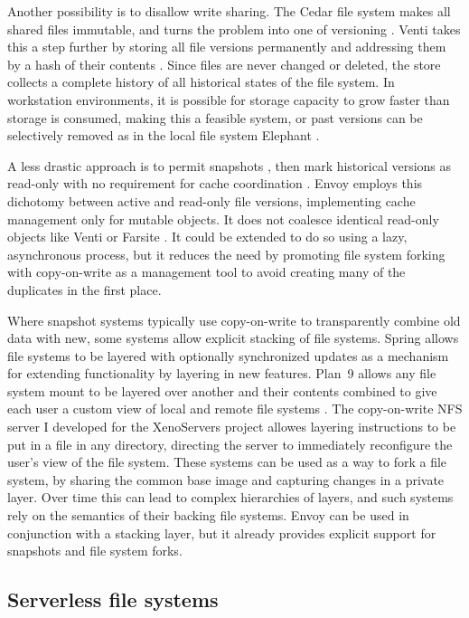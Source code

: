 Another possibility is to disallow write sharing. The Cedar file system \cite{schroeder} makes all shared files immutable, and turns the problem into one of versioning \cite{gifford}. Venti takes this a step further by storing all file versions permanently and addressing them by a hash of their contents \cite{quinlan}. Since files are never changed or deleted, the store collects a complete history of all historical states of the file system. In workstation environments, it is possible for storage capacity to grow faster than storage is consumed, making this a feasible system, or past versions can be selectively removed as in the local file system Elephant \cite{santry}.

A less drastic approach is to permit snapshots \cite{hitz}, then mark historical versions as read-only with no requirement for cache coordination \cite{warfield}. Envoy employs this dichotomy between active and read-only file versions, implementing cache management only for mutable objects. It does not coalesce identical read-only objects like Venti or Farsite \cite{douceur02}. It could be extended to do so using a lazy, asynchronous process, but it reduces the need by promoting file system forking with copy-on-write as a management tool to avoid creating many of the duplicates in the first place.

Where snapshot systems typically use copy-on-write to transparently combine old data with new, some systems allow explicit stacking of file systems. Spring \cite{khalidi} allows file systems to be layered with optionally synchronized updates as a mechanism for extending functionality by layering in new features. Plan~9 \cite{pike90} allows any file system mount to be layered over another and their contents combined to give each user a custom view of local and remote file systems \cite{pike92}. The copy-on-write NFS server I developed for the XenoServers project \cite{kotsovinos04b} allowes layering instructions to be put in a file in any directory, directing the server to immediately reconfigure the user's view of the file system. These systems can be used as a way to fork a file system, by sharing the common base image and capturing changes in a private layer. Over time this can lead to complex hierarchies of layers, and such systems rely on the semantics of their backing file systems. Envoy can be used in conjunction with a stacking layer, but it already provides explicit support for snapshots and file system forks.

\subsection{Serverless file systems}

